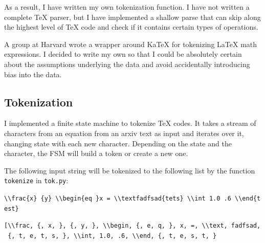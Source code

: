 \documentclass[]{article}
\begin{document}
As a result, I have written my own tokenization function. I have not
written a complete TeX parser, but I have implemented a shallow parse
that can skip along the highest level of TeX code and check if it
contains certain types of operations.

A group at Harvard wrote a wrapper around KaTeX for tokenizing LaTeX
math expressions. I decided to write my own so that I could be
absolutely certain about the assumptions underlying the data and avoid
accidentally introducing bias into the data.

\hypertarget{tokenization}{%
\subsection{Tokenization}\label{tokenization}}

I implemented a finite state machine to tokenize TeX codes. It takes a
stream of characters from an equation from an arxiv text as input and
iterates over it, changing state with each new character. Depending on
the state and the character, the FSM will build a token or create a new
one.

The following input string will be tokenized to the following list by
the function \texttt{tokenize} in \texttt{tok.py}:

\texttt{\textquotesingle{}\textbackslash{}\textbackslash{}frac\{x\}\ \{y\}\ \textbackslash{}\textbackslash{}begin\{eq\ \}x\ =\ \textbackslash{}\textbackslash{}textfadfsad\{tets\}\ \textbackslash{}\textbackslash{}int\ 1.0\ .6\ \textbackslash{}\textbackslash{}end\{test\}\textquotesingle{}}

\texttt{{[}\textquotesingle{}\textbackslash{}\textbackslash{}frac\textquotesingle{},\ \textquotesingle{}\{\textquotesingle{},\ \textquotesingle{}x\textquotesingle{},\ \textquotesingle{}\}\textquotesingle{},\ \textquotesingle{}\{\textquotesingle{},\ \textquotesingle{}y\textquotesingle{},\ \textquotesingle{}\}\textquotesingle{},\ \textquotesingle{}\textbackslash{}\textbackslash{}begin\textquotesingle{},\ \textquotesingle{}\{\textquotesingle{},\ \textquotesingle{}e\textquotesingle{},\ \textquotesingle{}q\textquotesingle{},\ \textquotesingle{}\}\textquotesingle{},\ \textquotesingle{}x\textquotesingle{},\ \textquotesingle{}=\textquotesingle{},\ \textquotesingle{}\textbackslash{}\textbackslash{}text\textquotesingle{},\ \textquotesingle{}fadfsad\textquotesingle{},\ \textquotesingle{}\{\textquotesingle{},\ \textquotesingle{}t\textquotesingle{},\ \textquotesingle{}e\textquotesingle{},\ \textquotesingle{}t\textquotesingle{},\ \textquotesingle{}s\textquotesingle{},\ \textquotesingle{}\}\textquotesingle{},\ \textquotesingle{}\textbackslash{}\textbackslash{}int\textquotesingle{},\ \textquotesingle{}1.0\textquotesingle{},\ \textquotesingle{}.6\textquotesingle{},\ \textquotesingle{}\textbackslash{}\textbackslash{}end\textquotesingle{},\ \textquotesingle{}\{\textquotesingle{},\ \textquotesingle{}t\textquotesingle{},\ \textquotesingle{}e\textquotesingle{},\ \textquotesingle{}s\textquotesingle{},\ \textquotesingle{}t\textquotesingle{},\ \textquotesingle{}\}\textquotesingle{}{]}}
\end{document}
